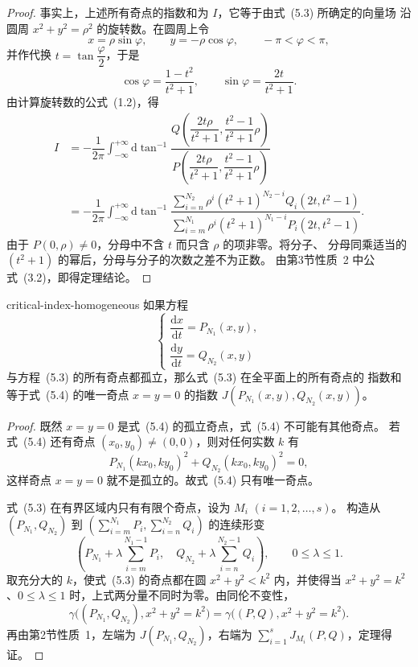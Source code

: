 \begin{proof}
事实上，上述所有奇点的指数和为 $I$，它等于由式~(5.3) 所确定的向量场
沿圆周 $x^2+y^2=\rho^2$ 的旋转数。在圆周上令
\[
x=\rho\sin\varphi,\qquad y=-\rho\cos\varphi,\qquad -\pi<\varphi<\pi,
\]
并作代换 $t=\tan\dfrac{\varphi}{2}$，于是
\[
\cos\varphi=\dfrac{1-t^2}{t^2+1},\qquad
\sin\varphi=\dfrac{2t}{t^2+1}.
\]
由计算旋转数的公式~(1.2)，得
\[
\begin{aligned}
I
&=-\dfrac{1}{2\pi}\int_{-\infty}^{+\infty}
\mathrm{d}\tan^{-1}
\dfrac{
Q\left(\dfrac{2t\rho}{t^2+1},\dfrac{t^2-1}{t^2+1}\rho\right)}
{
P\left(\dfrac{2t\rho}{t^2+1},\dfrac{t^2-1}{t^2+1}\rho\right)
}\\
&=-\dfrac{1}{2\pi}\int_{-\infty}^{+\infty}
\mathrm{d}\tan^{-1}
\dfrac{
\sum_{i=n}^{N_2}\rho^i(t^2+1)^{N_2-i}Q_i(2t,t^2-1)}
{
\sum_{i=m}^{N_1}\rho^i(t^2+1)^{N_1-i}P_i(2t,t^2-1)}.
\end{aligned}
\]
由于 $P(0,\rho)\ne0$，分母中不含 $t$ 而只含 $\rho$ 的项非零。将分子、
分母同乘适当的 $(t^2+1)$ 的幂后，分母与分子的次数之差不为正数。
由第3节性质~2 中公式~(3.2)，即得定理结论。
\end{proof}

\begin{theorem}{}{critical-index-homogeneous}
如果方程
\[
\begin{cases}
\dfrac{\mathrm{d}x}{\mathrm{d}t}=P_{N_1}(x,y),\\
\dfrac{\mathrm{d}y}{\mathrm{d}t}=Q_{N_2}(x,y)
\end{cases} \tag{5.4}
\]
与方程~(5.3) 的所有奇点都孤立，那么式~(5.3) 在全平面上的所有奇点的
指数和等于式~(5.4) 的唯一奇点 $x=y=0$ 的指数
$J(P_{N_1}(x,y),Q_{N_2}(x,y))$。
\end{theorem}

\begin{proof}
既然 $x=y=0$ 是式~(5.4) 的孤立奇点，式~(5.4) 不可能有其他奇点。
若式~(5.4) 还有奇点 $(x_0,y_0)\ne(0,0)$，则对任何实数 $k$ 有
\[
P_{N_1}(kx_0,ky_0)^2+Q_{N_2}(kx_0,ky_0)^2=0,
\]
这样奇点 $x=y=0$ 就不是孤立的。故式~(5.4) 只有唯一奇点。

式~(5.3) 在有界区域内只有有限个奇点，设为 $M_i$ $(i=1,2,\ldots,s)$。
构造从 $(P_{N_1},Q_{N_2})$ 到
$\left(\sum_{i=m}^{N_1}P_i,\sum_{i=n}^{N_2}Q_i\right)$ 的连续形变
\[
\left(
P_{N_1}+\lambda\sum_{i=m}^{N_1-1}P_i,\quad
Q_{N_2}+\lambda\sum_{i=n}^{N_2-1}Q_i
\right),\qquad 0\leq\lambda\leq1.
\]
取充分大的 $k$，使式~(5.3) 的奇点都在圆 $x^2+y^2<k^2$ 内，并使得当
$x^2+y^2=k^2$、$0\leq\lambda\leq1$ 时，上式两分量不同时为零。由同伦不变性，
\[
\gamma\bigl((P_{N_1},Q_{N_2}),x^2+y^2=k^2\bigr)
=\gamma\bigl((P,Q),x^2+y^2=k^2\bigr).
\]
再由第2节性质~1，左端为 $J(P_{N_1},Q_{N_2})$，右端为
$\sum_{i=1}^sJ_{M_i}(P,Q)$，定理得证。
\end{proof}

